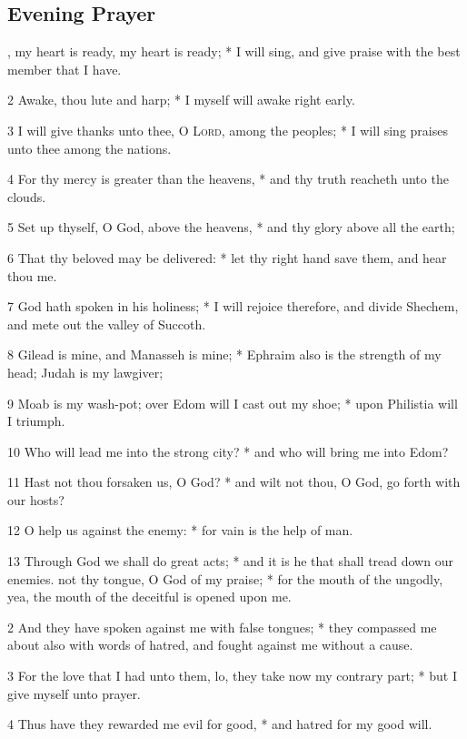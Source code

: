 \subsection{Evening Prayer}
, my heart is ready, my heart is ready; * I will sing, and give praise with the best member that I have.\par
2 Awake, thou lute and harp; * I myself will awake right early.\par
3 I will give thanks unto thee, O {\textsc{Lord}}, among the peoples; * I will sing praises unto thee among the nations.\par
4 For thy mercy is greater than the heavens, * and thy truth reacheth unto the clouds.\par
5 Set up thyself, O God, above the heavens, * and thy glory above all the earth;\par
6 That thy beloved may be delivered: * let thy right hand save them, and hear thou me.\par
7 God hath spoken in his holiness; * I will rejoice therefore, and divide Shechem, and mete out the valley of Succoth.\par
8 Gilead is mine, and Manasseh is mine; * Ephraim also is the strength of my head; Judah is my lawgiver;\par
9 Moab is my wash-pot; over Edom will I cast out my shoe; * upon Philistia will I triumph.\par
10 Who will lead me into the strong city? * and who will bring me into Edom?\par
11 Hast not thou forsaken us, O God? * and wilt not thou, O God, go forth with our hosts?\par
12 O help us against the enemy: * for vain is the help of man.\par
13 Through God we shall do great acts; * and it is he that shall tread down our enemies.
 not thy tongue, O God of my praise; * for the mouth of the ungodly, yea, the mouth of the deceitful is opened upon me.\par
2 And they have spoken against me with false tongues; * they compassed me about also with words of hatred, and fought against me without a cause.\par
3 For the love that I had unto them, lo, they take now my contrary part; * but I give myself unto prayer.\par
4 Thus have they rewarded me evil for good, * and hatred for my good will.\par
